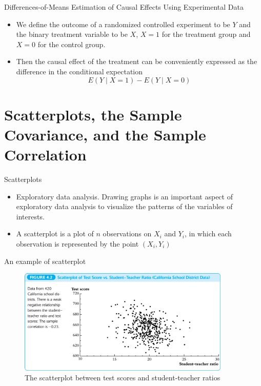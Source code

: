 \documentclass[presentation]{beamer}
\begin{document}
\begin{frame}[label={sec:org9fdc757}]{Differences-of-Means Estimation of Causal Effects Using Experimental Data}
\begin{itemize}
\item We define the outcome of a randomized controlled experiment to be \(Y\)
and the binary treatment variable to be \(X\), \(X=1\) for the treatment
group and \(X=0\) for the control group.

\item Then the causal effect of the
treatment can be conveniently expressed as the difference in the
conditional expectation
\[ E(Y \mid X=1) - E(Y \mid X=0) \]
\end{itemize}
\end{frame}


\section{Scatterplots, the Sample Covariance, and the Sample Correlation}
\label{sec:orgc51d2b2}

\begin{frame}[label={sec:org245a63a}]{Scatterplots}
\begin{itemize}
\item Exploratory data analysis. Drawing graphs is an important aspect of exploratory data
analysis to visualize the patterns of the variables of
interests.

\item A \alert{scatterplot} is a plot of \(n\) observations on \(X_i\) and \(Y_i\), in
which each observation is represented by the point \((X_i,
  Y_i)\)
\end{itemize}
\end{frame}

\begin{frame}[label={sec:org1bc25ab}]{An example of scatterplot}
\begin{figure}[htbp]
\centering
\includegraphics[width=0.9\textwidth]{figure/fig-4-2.png}
\caption{\label{fig:org85ab4e9}
The scatterplot between test scores and student-teacher ratios}
\end{figure}
\end{frame}
\end{document}
